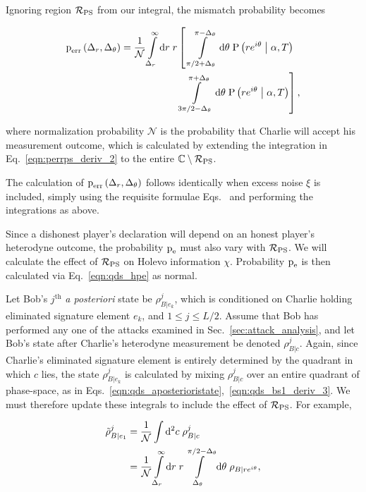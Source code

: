 \noindent Ignoring region $\mathcal{R}_{\text{PS}}$ from our integral, the mismatch probability becomes

\begin{align}\label{eqn:perrps_deriv_2}
\perr\left(\Delta_r, \Delta_\theta\right) = \frac{1}{\mathcal{N}} \int\limits_{\Delta_r}^{\infty} \mathrm{d}r \; r &\left[ \; \int\limits_{ \pi/2 + \Delta_\theta}^{\pi - \Delta_\theta} \mathrm{d}\theta \; \text{P}\left(r e^{i \theta} \given \alpha, T\right) \right. \notag \\
%
&\left. \int\limits_{3 \pi/2 - \Delta_\theta}^{\pi + \Delta_\theta} \mathrm{d}\theta \; \text{P}\left(r e^{i \theta} \given \alpha, T\right) \right],
\end{align}

\noindent where normalization probability $\mathcal{N}$ is the probability that Charlie will accept his measurement outcome, which is calculated by extending the integration in Eq.~\ref{eqn:perrps_deriv_2} to the entire $\mathbb{C} \setminus \mathcal{R}_{\text{PS}}$.

The calculation of $\text{p}_{\text{err}}\left(\Delta_r, \Delta_\theta\right)$ follows identically when excess noise $\xi$ is included, simply using the requisite formulae Eqs.~ and performing the integrations as above. 


Since a dishonest player's declaration will depend on an honest player's heterodyne outcome, the probability $\text{p}_{\text{e}}$ must also vary with $\mathcal{R}_{\text{PS}}$. We will calculate the effect of $\mathcal{R}_{\text{PS}}$ on Holevo information $\chi$. Probability $\text{p}_{\text{e}}$ is then calculated via Eq.~\ref{eqn:qds_hpe} as normal.

Let Bob's $j^{\text{th}}$ \emph{a posteriori} state be $\rho_{B | e_k}^j$, which is conditioned on Charlie holding eliminated signature element $e_k$, and $1\le j \le L/2$. Assume that Bob has performed any one of the attacks examined in Sec.~\ref{sec:attack_analysis}, and let Bob's state after Charlie's heterodyne measurement be denoted $\rho_{B | c}^j$. Again, since Charlie's eliminated signature element is entirely determined by the quadrant in which $c$ lies, the state $\rho_{B | e_k}^j$ is calculated by mixing $\rho_{B | c}^j$ over an entire quadrant of phase-space, as in Eqs.~\ref{eqn:qds_aposterioristate},~\ref{eqn:qds_bs1_deriv_3}. We must therefore update these integrals to include the effect of $\mathcal{R}_{\text{PS}}$. For example,

\begin{align}\label{eqn:qdsps_aposteriori}
\tilde{\rho}_{B | e_1}^j &= \frac{1}{\mathcal{N}} \int \Diff2 c \; \rho_{B | c}^j \notag \\
%
&=\frac{1}{\mathcal{N}} \int\limits_{\Delta_r}^\infty \mathrm{d}r\; r\int\limits_{\Delta_\theta}^{\pi/2 - \Delta_\theta} \mathrm{d}\theta \; \rho_{B | r e^{i \theta}},
\end{align}

